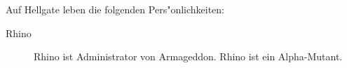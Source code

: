 
Auf Hellgate leben die folgenden Pers"onlichkeiten: 

\begin{description}    
    \item[Rhino] Rhino ist Administrator von Armageddon. Rhino ist ein Alpha-Mutant. 
\end{description}
